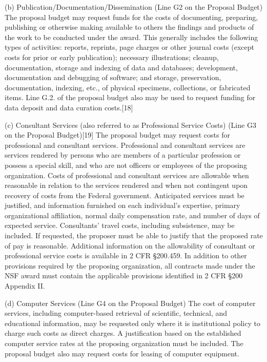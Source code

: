 {(b) Publication/Documentation/Dissemination (Line G2 on the Proposal Budget)
The proposal budget may request funds for the costs of documenting, preparing, publishing or otherwise making available to others the findings and products of the work to be conducted under the award. This generally includes the following types of activities: reports, reprints, page charges or other journal costs (except costs for prior or early publication); necessary illustrations; cleanup, documentation, storage and indexing of data and databases; development, documentation and debugging of software; and storage, preservation, documentation, indexing, etc., of physical specimens, collections, or fabricated items. Line G.2. of the proposal budget also may be used to request funding for data deposit and data curation costs.[18]

(c) Consultant Services (also referred to as Professional Service Costs) (Line G3 on the Proposal Budget)[19]
The proposal budget may request costs for professional and consultant services. Professional and consultant services are services rendered by persons who are members of a particular profession or possess a special skill, and who are not officers or employees of the proposing organization. Costs of professional and consultant services are allowable when reasonable in relation to the services rendered and when not contingent upon recovery of costs from the Federal government. Anticipated services must be justified, and information furnished on each individual’s expertise, primary organizational affiliation, normal daily compensation rate, and number of days of expected service. Consultants’ travel costs, including subsistence, may be included. If requested, the proposer must be able to justify that the proposed rate of pay is reasonable. Additional information on the allowability of consultant or professional service costs is available in 2 CFR §200.459. In addition to other provisions required by the proposing organization, all contracts made under the NSF award must contain the applicable provisions identified in 2 CFR §200 Appendix II.

(d) Computer Services (Line G4 on the Proposal Budget)
The cost of computer services, including computer-based retrieval of scientific, technical, and educational information, may be requested only where it is institutional policy to charge such costs as direct charges. A justification based on the established computer service rates at the proposing organization must be included. The proposal budget also may request costs for leasing of computer equipment.

}
